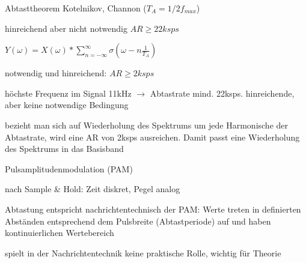 \documentclass[a4paper]{article}
\begin{document}
\begin{multicols}{3}

  Abtasttheorem Kotelnikov, Channon ($T_A=1/2f_{max}$)
  \begin{itemize*}
    \item hinreichend aber nicht notwendig $AR\geq 22ksps$
    \item $Y(\omega)=X(\omega)*\sum^{\infty}_{n=-\infty} \sigma(\omega-n\frac{1}{T_A})$
    \item notwendig und hinreichend: $AR\geq 2ksps$
    \item höchste Frequenz im Signal 11kHz $\rightarrow$ Abtastrate mind. 22ksps. hinreichende, aber keine notwendige Bedingung
    \item bezieht man sich auf Wiederholung des Spektrums um jede Harmonische der Abtastrate, wird eine AR von 2ksps ausreichen. Damit passt eine Wiederholung des Spektrums in das Basisband
  \end{itemize*}

  Pulsamplitudenmodulation (PAM)
  \begin{itemize*}
    \item nach Sample \& Hold: Zeit diskret, Pegel analog
    \item Abtastung entspricht nachrichtentechnisch der PAM: Werte treten in definierten Abständen entsprechend dem Pulsbreite (Abtastperiode) auf und haben kontinuierlichen Wertebereich
    \item spielt in der Nachrichtentechnik keine praktische Rolle, wichtig für Theorie
  \end{itemize*}


\end{multicols}
\end{document}
